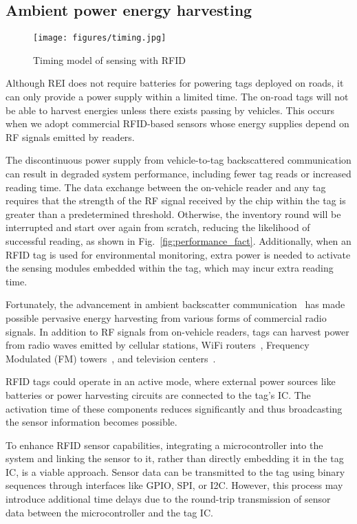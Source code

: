 \documentclass[lettersize,journal]{IEEEtran}
\begin{document}
\subsection{Ambient power energy harvesting}
\begin{figure*}[tb!]
\centering
\texttt{[image: figures/timing.jpg]}
\caption{Timing model of sensing with RFID}
\label{fig:timing}
\end{figure*}
Although REI does not require batteries for powering tags deployed on roads, it can only provide a power supply within a limited time. The on-road tags will not be able to harvest energies unless there exists passing by vehicles. This occurs when we adopt commercial RFID-based sensors whose energy supplies depend on RF signals emitted by readers. 

The discontinuous power supply from vehicle-to-tag backscattered communication can result in degraded system performance, including fewer tag reads or increased reading time. The data exchange between the on-vehicle reader and any tag requires that the strength of the RF signal received by the chip within the tag is greater than a predetermined threshold. Otherwise, the inventory round will be interrupted and start over again from scratch, reducing the likelihood of successful reading, as shown in Fig.~\ref{fig:performance_fact}. Additionally, when an RFID tag is used for environmental monitoring, extra power is needed to activate the sensing modules embedded within the tag, which may incur extra reading time.

Fortunately, the advancement in ambient backscatter communication~\cite{torres2021backscatter} has made possible pervasive energy harvesting from various forms of commercial radio signals. In addition to RF signals from on-vehicle readers, tags can harvest power from radio waves emitted by cellular stations, WiFi routers~\cite{kellogg2014wi}, Frequency Modulated (FM) towers~\cite{daskalakis2017ambient}, and television centers~\cite{liu2013ambient}.
 
RFID tags could operate in an active mode, where external power sources like batteries or power harvesting circuits are connected to the tag's IC.  The activation time of these components reduces significantly and thus broadcasting the sensor information becomes possible. 

To enhance RFID sensor capabilities, integrating a microcontroller into the system and linking the sensor to it, rather than directly embedding it in the tag IC, is a viable approach. Sensor data can be transmitted to the tag using binary sequences through interfaces like GPIO, SPI, or I2C. However, this process may introduce additional time delays due to the round-trip transmission of sensor data between the microcontroller and the tag IC.
\end{document}
